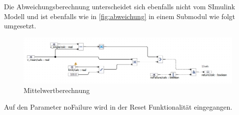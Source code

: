 Die Abweichungsberechnung unterscheidet sich ebenfalls nicht vom SImulink Modell und ist ebenfalls wie in \autoref{fig:abweichung} in einem Submodul wie folgt umgesetzt.
\begin{figure}[H]
	\centering
	\includegraphics[width=\linewidth]{../Graphiken/devCalc}
	\caption{Mittelwertberechnung}
	\label{fig:devCalc}
\end{figure}
Auf den Parameter noFailure wird in der Reset Funktionalität eingegangen.






